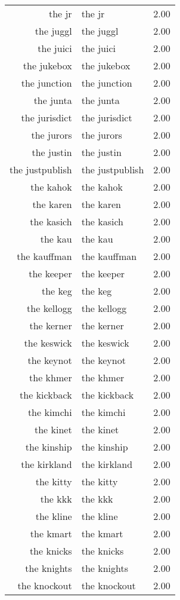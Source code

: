 \begin{table}[ht]
\begin{tabular}{rlr}
  the jr & the jr & 2.00 \\ 
  the juggl & the juggl & 2.00 \\ 
  the juici & the juici & 2.00 \\ 
  the jukebox & the jukebox & 2.00 \\ 
  the junction & the junction & 2.00 \\ 
  the junta & the junta & 2.00 \\ 
  the jurisdict & the jurisdict & 2.00 \\ 
  the jurors & the jurors & 2.00 \\ 
  the justin & the justin & 2.00 \\ 
  the justpublish & the justpublish & 2.00 \\ 
  the kahok & the kahok & 2.00 \\ 
  the karen & the karen & 2.00 \\ 
  the kasich & the kasich & 2.00 \\ 
  the kau & the kau & 2.00 \\ 
  the kauffman & the kauffman & 2.00 \\ 
  the keeper & the keeper & 2.00 \\ 
  the keg & the keg & 2.00 \\ 
  the kellogg & the kellogg & 2.00 \\ 
  the kerner & the kerner & 2.00 \\ 
  the keswick & the keswick & 2.00 \\ 
  the keynot & the keynot & 2.00 \\ 
  the khmer & the khmer & 2.00 \\ 
  the kickback & the kickback & 2.00 \\ 
  the kimchi & the kimchi & 2.00 \\ 
  the kinet & the kinet & 2.00 \\ 
  the kinship & the kinship & 2.00 \\ 
  the kirkland & the kirkland & 2.00 \\ 
  the kitty & the kitty & 2.00 \\ 
  the kkk & the kkk & 2.00 \\ 
  the kline & the kline & 2.00 \\ 
  the kmart & the kmart & 2.00 \\ 
  the knicks & the knicks & 2.00 \\ 
  the knights & the knights & 2.00 \\ 
  the knockout & the knockout & 2.00 \\ 

\end{tabular}
\end{table}
